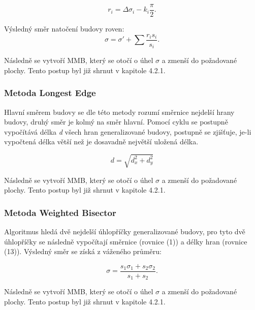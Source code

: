 \documentclass[11pt]{article}
\begin{document}
	\begin{equation}
		r_i = \Delta\sigma_i - k_i\dfrac{\pi}{2}.
	\end{equation}
	
	Výsledný směr natočení budovy roven:
	\begin{equation}
		\sigma=\sigma'+\sum\frac{r_is_i}{s_i}.
	\end{equation}

	Následně se vytvoří MMB, který se otočí o úhel $ \sigma $ a zmenší do požadované plochy. Tento postup byl již shrnut v kapitole 4.2.1.
	
	\subsubsection{Metoda Longest Edge}
	Hlavní směrem budovy se dle této metody rozumí směrnice nejdelší hrany budovy, druhý směr je kolmý na směr hlavní. 	
	Pomocí cyklu se postupně vypočítává délka \textit{d} všech hran generalizované budovy, postupně se zjišťuje, je-li vypočtená délka větší než je dosavadně největší uložená délka.
	
	\begin{equation}
		d = \sqrt{d_x ^2 + d_y ^2}
	\end{equation}
	
	Následně se vytvoří MMB, který se otočí o úhel $ \sigma $ a zmenší do požadované plochy. Tento postup byl již shrnut v kapitole 4.2.1.
	
	\subsubsection{Metoda Weighted Bisector}				 
	Algoritmus hledá dvě nejdelší úhlopříčky generalizované budovy, pro tyto dvě úhlopříčky se následně vypočítají směrnice (rovnice (1)) a délky hran (rovnice (13)). Výsledný směr se získá z váženého průměru:
	
	\begin{equation}
		\sigma = \frac{s_1\sigma_1+s_2\sigma_2}{s_1+s_2}.
	\end{equation}

	Následně se vytvoří MMB, který se otočí o úhel $ \sigma $ a zmenší do požadované plochy. Tento postup byl již shrnut v kapitole 4.2.1.
	
		
	
\end{document}
